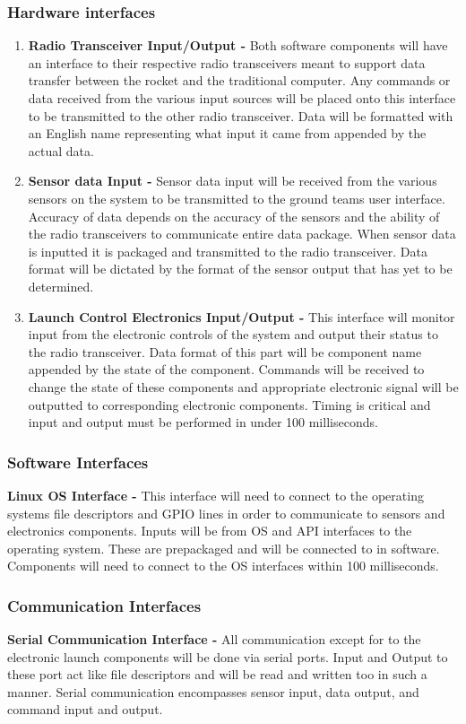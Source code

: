 \documentclass[10pt,draftclsnofoot,onecolumn,compsoc]{IEEEtran}
\begin{document}
\subsubsection{Hardware interfaces }
\begin{enumerate}
\item {\bf Radio Transceiver Input/Output -}
		Both software components will have an interface to their respective radio transceivers meant to support data transfer between the rocket and the traditional computer. Any commands or data received from the various input sources will be placed onto this interface to be transmitted to the other radio transceiver. Data will be formatted with an English name representing what input it came from appended by the actual data.
\item {\bf Sensor data Input -}
Sensor data input will be received from the various sensors on the system to be transmitted to the ground teams user interface. Accuracy of data depends on the accuracy of the sensors and the ability of the radio transceivers to communicate entire data package. When sensor data is inputted it is packaged and transmitted to the radio transceiver. Data format will be dictated by the format of the sensor output that has yet to be determined.
\item {\bf Launch Control Electronics Input/Output -}
This interface will monitor input from the electronic controls of the system and output their status to the radio transceiver. Data format of this part will be component name appended by the state of the component. Commands will be received to change the state of these components and appropriate electronic signal will be outputted to corresponding electronic components. Timing is critical and input and output must be performed in under 100 milliseconds.
\end{enumerate}

\subsubsection{Software Interfaces}
{\bf Linux OS Interface -} This interface will need to connect to the operating systems file descriptors and GPIO lines in order to communicate to sensors and electronics components. Inputs will be from OS and API interfaces to the operating system. These are prepackaged and will be connected to in software. Components will need to connect to the OS interfaces within 100 milliseconds. 

\subsubsection{Communication Interfaces}
{\bf Serial Communication Interface -} All communication except for to the electronic launch components will be done via serial ports. Input and Output to these port act like file descriptors and will be read and written too in such a manner. Serial communication encompasses sensor input, data output, and command input and output.
\end{document}

